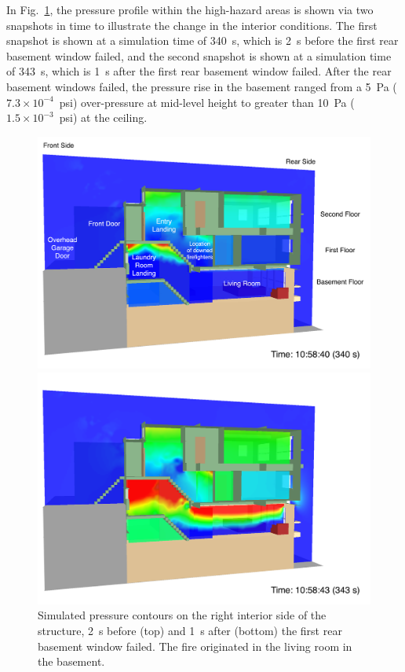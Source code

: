 \documentclass[12pt,oneside]{book}
\begin{document}
In Fig.~\ref{fig:smv_pressure}, the pressure profile within the high-hazard areas is shown via two snapshots in time to illustrate the change in the interior conditions. The first snapshot is shown at a simulation time of 340~s, which is 2~s before the first rear basement window failed, and the second snapshot is shown at a simulation time of 343~s, which is 1~s after the first rear basement window failed. After the rear basement windows failed, the pressure rise in the basement ranged from a 5~Pa ($7.3 \times 10^{-4}$~psi) over-pressure at mid-level height to greater than 10~Pa ($1.5 \times 10^{-3}$~psi) at the ceiling.

\begin{figure}[!ht]
\includegraphics[width=5.5in]{../Figures/SMV_Pres_340_s}

\includegraphics[width=5.5in]{../Figures/SMV_Pres_343_s}

\caption[Simulated pressure contours on the right interior side of the structure.]
{Simulated pressure contours on the right interior side of the structure, 2~s before (top) and 1~s after (bottom) the first rear basement window failed. The fire originated in the living room in the basement.}
\label{fig:smv_pressure}
\end{figure}
\end{document}
